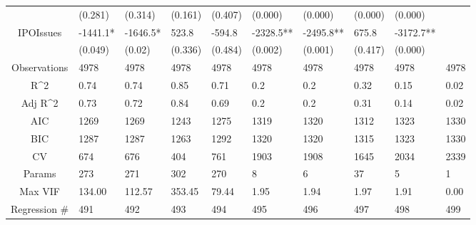 \documentclass{article}
\begin{document}
\begin{table}[H]
\begin{tabular}{|clllllllll|}
   & (0.281) & (0.314) & (0.161) & (0.407) & (0.000) & (0.000) & (0.000) & (0.000) &  \\ 
  IPOIssues & -1441.1* & -1646.5* & 523.8 & -594.8 & -2328.5** & -2495.8** & 675.8 & -3172.7** &  \\ 
   & (0.049) & (0.02) & (0.336) & (0.484) & (0.002) & (0.001) & (0.417) & (0.000) &  \\ 
  \hline 
 Observations & 4978 & 4978 & 4978 & 4978 & 4978 & 4978 & 4978 & 4978 & 4978 \\ 
  R^2 & 0.74 & 0.74 & 0.85 & 0.71 & 0.2 & 0.2 & 0.32 & 0.15 & 0.02 \\ 
  Adj R^2 & 0.73 & 0.72 & 0.84 & 0.69 & 0.2 & 0.2 & 0.31 & 0.14 & 0.02 \\ 
  AIC & 1269 & 1269 & 1243 & 1275 & 1319 & 1320 & 1312 & 1323 & 1330 \\ 
  BIC & 1287 & 1287 & 1263 & 1292 & 1320 & 1320 & 1315 & 1323 & 1330 \\ 
  CV & 674 & 676 & 404 & 761 & 1903 & 1908 & 1645 & 2034 & 2339 \\ 
  Params & 273 & 271 & 302 & 270 & 8 & 6 & 37 & 5 & 1 \\ 
  Max VIF & 134.00 & 112.57 & 353.45 & 79.44 & 1.95 & 1.94 & 1.97 & 1.91 & 0.00 \\ 
  Regression \# & 491 & 492 & 493 & 494 & 495 & 496 & 497 & 498 & 499 \\ 
   \hline
\end{tabular}
 
\end{table}
\end{document}
